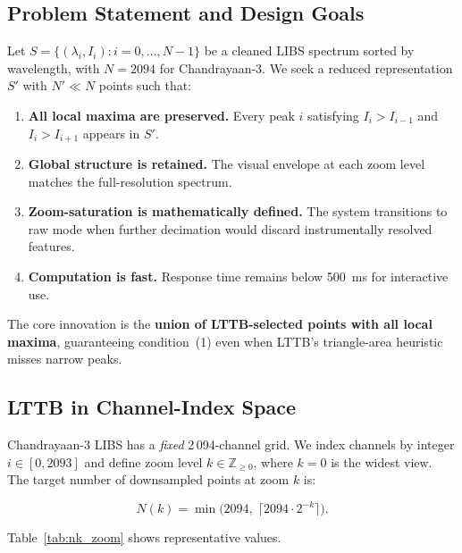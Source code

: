 \documentclass[a4paper,twocolumn,10pt]{article}
\begin{document}
\subsection{Problem Statement and Design Goals}

Let $S = \{(\lambda_i, I_i) : i = 0, \ldots, N-1\}$ be a cleaned
LIBS spectrum sorted by wavelength, with $N = 2094$ for Chandrayaan-3.
We seek a reduced representation $S'$ with $N' \ll N$ points such that:

\begin{enumerate}[nosep,leftmargin=*]
  \item \textbf{All local maxima are preserved.}  Every peak
    $i$ satisfying $I_i > I_{i-1}$ and $I_i > I_{i+1}$ appears in $S'$.
  \item \textbf{Global structure is retained.}  The visual envelope
    at each zoom level matches the full-resolution spectrum.
  \item \textbf{Zoom-saturation is mathematically defined.}  The
    system transitions to raw mode when further decimation would
    discard instrumentally resolved features.
  \item \textbf{Computation is fast.}  Response time remains below
    \SI{500}{\milli\second} for interactive use.
\end{enumerate}

The core innovation is the \textbf{union of LTTB-selected points with
all local maxima}, guaranteeing condition~(1) even when LTTB's
triangle-area heuristic misses narrow peaks.

\subsection{LTTB in Channel-Index Space}

Chandrayaan-3 LIBS has a \emph{fixed} 2\,094-channel grid.  We index
channels by integer $i \in [0, 2093]$ and define zoom level $k \in
\mathbb{Z}_{\geq 0}$, where $k=0$ is the widest view.  The target
number of downsampled points at zoom $k$ is:

\begin{equation}
\label{eq:nk}
N(k) = \min\!\bigl(2094,\; \lceil 2094 \cdot 2^{-k} \rceil\bigr).
\end{equation}

Table~\ref{tab:nk_zoom} shows representative values.
\end{document}
